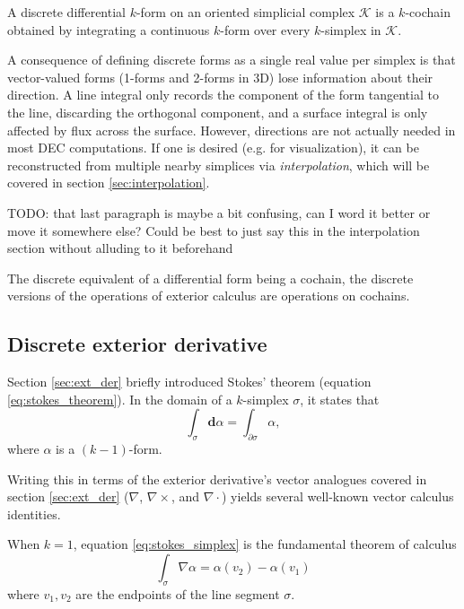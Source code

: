 \documentclass[utf8,english]{gradu3}
\begin{document}
A discrete differential $k$-form on an oriented simplicial complex $\mathcal{K}$
is a $k$-cochain obtained by integrating a continuous $k$-form
over every $k$-simplex in $\mathcal{K}$.

A consequence of defining discrete forms as a single real value per simplex
is that vector-valued forms (1-forms and 2-forms in 3D)
lose information about their direction.
A line integral only records the component of the form tangential to the line,
discarding the orthogonal component,
and a surface integral is only affected by flux across the surface.
However, directions are not actually needed in most DEC computations.
If one is desired (e.g. for visualization),
it can be reconstructed from multiple nearby simplices via \textit{interpolation},
which will be covered in section \ref{sec:interpolation}.

TODO: that last paragraph is maybe a bit confusing,
can I word it better or move it somewhere else?
Could be best to just say this in the interpolation section
without alluding to it beforehand

The discrete equivalent of a differential form being a cochain,
the discrete versions of the operations of exterior calculus
are operations on cochains.

\subsection{Discrete exterior derivative}\label{sec:disc_ext_der}

Section \ref{sec:ext_der} briefly introduced Stokes' theorem
(equation \ref{eq:stokes_theorem}).
In the domain of a $k$-simplex $\sigma$, it states that
\begin{equation}\label{eq:stokes_simplex}
  \int_{\sigma} \mathbf{d}\alpha = \int_{\partial\sigma} \alpha,
\end{equation}
where $\alpha$ is a $(k-1)$-form.

Writing this in terms of the exterior derivative's
vector analogues covered in section \ref{sec:ext_der}
($\nabla$, $\nabla \times$, and $\nabla \cdot$)
yields several well-known vector calculus identities.

When $k = 1$, equation \ref{eq:stokes_simplex}
is the fundamental theorem of calculus
\begin{equation}\label{eq:fund_theorem_calc}
  \int_{\sigma} \nabla \alpha = \alpha(v_2) - \alpha(v_1)
\end{equation}
where $v_1,v_2$ are the endpoints of the line segment $\sigma$.
\end{document}
